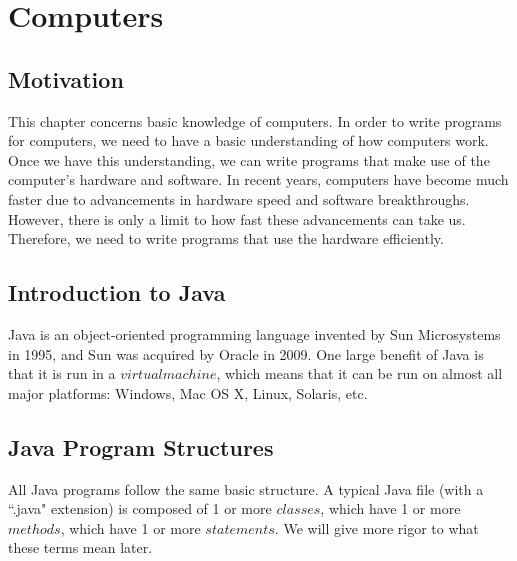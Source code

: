 \section{Computers}
%
\subsection{Motivation}
This chapter concerns basic knowledge of computers. In order to write programs for computers, we need to have a basic understanding of how computers work. Once we have this understanding, we can write programs that make use of the computer's hardware and software. In recent years, computers have become much faster due to advancements in hardware speed and software breakthroughs. However, there is only a limit to how fast these advancements can take us. Therefore, we need to write programs that use the hardware efficiently.

\subsection{Introduction to Java}
Java is an object-oriented programming language invented by Sun Microsystems in 1995, and Sun was acquired by Oracle in 2009. One large benefit of Java is that it is run in a $virtual machine$, which means that it can be run on almost all major platforms: Windows, Mac OS X, Linux, Solaris, etc. 

\subsection{Java Program Structures}
All Java programs follow the same basic structure. A typical Java file (with a ``.java" extension) is composed of 1 or more $classes$, which have 1 or more $methods$, which have 1 or more $statements$. We will give more rigor to what these terms mean later.

